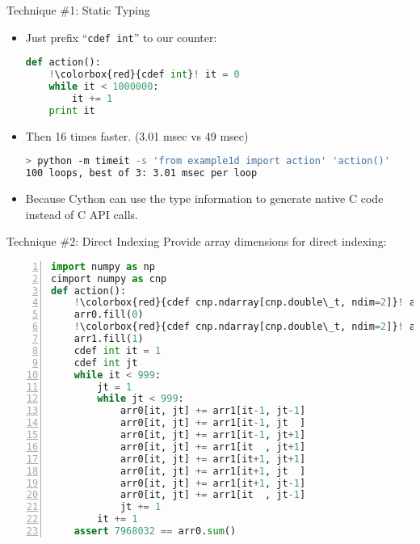 \documentclass[dvips,xcolor=pst,14pt]{beamer}
\begin{document}
\begin{frame}[fragile]{
%
Technique \#1: Static Typing
%
}
\begin{itemize}
\item Just prefix ``{\color{red}\verb+cdef int+}'' to our counter:
\begin{lstlisting}[basicstyle=\scriptsize\ttfamily,language=Python,escapechar=!]
def action():
    !\colorbox{red}{cdef int}! it = 0
    while it < 1000000:
        it += 1
    print it
\end{lstlisting}
\item Then 16 times faster. (3.01 msec vs 49 msec)
\begin{lstlisting}[language=bash]
> python -m timeit -s 'from example1d import action' 'action()'
100 loops, best of 3: 3.01 msec per loop
\end{lstlisting}
\item Because Cython can use the type information to generate native C code
instead of C API calls.
\end{itemize}
\end{frame}

\begin{frame}[fragile]{
%
Technique \#2: Direct Indexing
%
}
Provide array dimensions for direct indexing:
\begin{lstlisting}[basicstyle=\tiny\ttfamily,language=Python,numbers=left,escapechar=!]
import numpy as np
cimport numpy as cnp
def action():
    !\colorbox{red}{cdef cnp.ndarray[cnp.double\_t, ndim=2]}! arr0 = np.empty([1000,1000], dtype='float64')
    arr0.fill(0)
    !\colorbox{red}{cdef cnp.ndarray[cnp.double\_t, ndim=2]}! arr1 = np.empty([1000,1000], dtype='float64')
    arr1.fill(1)
    cdef int it = 1
    cdef int jt
    while it < 999:
        jt = 1
        while jt < 999:
            arr0[it, jt] += arr1[it-1, jt-1]
            arr0[it, jt] += arr1[it-1, jt  ]
            arr0[it, jt] += arr1[it-1, jt+1]
            arr0[it, jt] += arr1[it  , jt+1]
            arr0[it, jt] += arr1[it+1, jt+1]
            arr0[it, jt] += arr1[it+1, jt  ]
            arr0[it, jt] += arr1[it+1, jt-1]
            arr0[it, jt] += arr1[it  , jt-1]
            jt += 1
        it += 1
    assert 7968032 == arr0.sum()
\end{lstlisting}
\end{frame}
\end{document}
